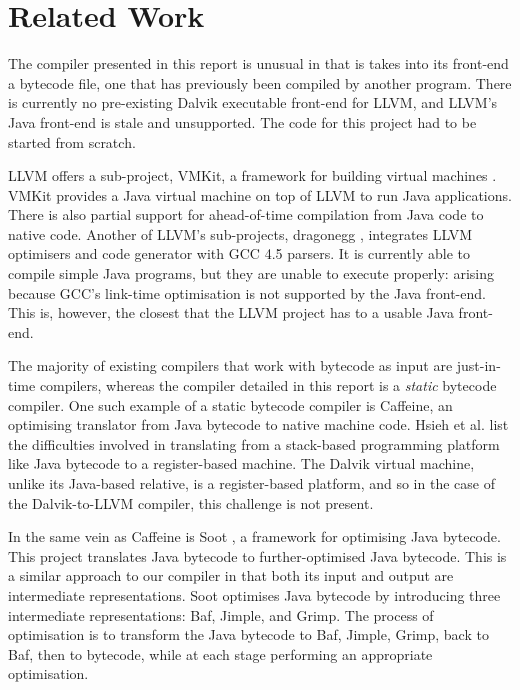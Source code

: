 \chapter{Related Work}
\label{chap:related}

The compiler presented in this report is unusual in that is takes into its front-end a bytecode file, one that has previously been compiled by another program. There is currently no pre-existing Dalvik executable front-end for LLVM, and LLVM's Java front-end is stale and unsupported\footnotemark {}. The code for this project had to be started from scratch.

LLVM offers a sub-project, VMKit, a framework for building virtual machines \cite{geoffray10vmkit}. VMKit provides a Java virtual machine on top of LLVM to run Java applications. There is also partial support for ahead-of-time compilation from Java code to native code. Another of LLVM's sub-projects, dragonegg \cite{dragonegg}, integrates LLVM optimisers and code generator with GCC 4.5 parsers. It is currently able to compile simple Java programs, but they are unable to execute properly: arising because GCC's link-time optimisation is not supported by the Java front-end. This is, however, the closest that the LLVM project has to a usable Java front-end.

The majority of existing compilers that work with bytecode as input are just-in-time compilers, whereas the compiler detailed in this report is a \emph{static} bytecode compiler. One such example of a static bytecode compiler is Caffeine\cite{Hsieh:1996:JBN:243846.243864}, an optimising translator from Java bytecode to native machine code. Hsieh et al. list the difficulties involved in translating from a stack-based programming platform like Java bytecode to a register-based machine. The Dalvik virtual machine, unlike its Java-based relative, is a register-based platform, and so in the case of the Dalvik-to-LLVM compiler, this challenge is not present.

In the same vein as Caffeine is Soot \cite{Vallee-Rai:1999:SJB:781995.782008}, a framework for optimising Java bytecode. This project translates Java bytecode to further-optimised Java bytecode. This is a similar approach to our compiler in that both its input and output are intermediate representations. Soot optimises Java bytecode by introducing three intermediate representations: Baf, Jimple, and Grimp. The process of optimisation is to transform the Java bytecode to Baf, Jimple, Grimp, back to Baf, then to bytecode, while at each stage performing an appropriate optimisation.

